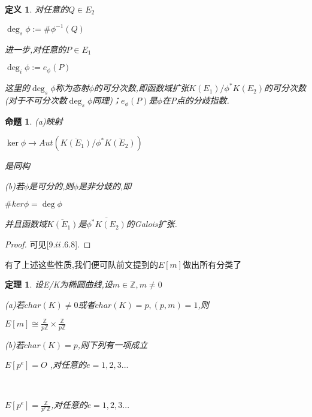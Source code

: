 \documentclass[11pt]{ctexart}
\DeclareMathOperator{\Deg}{deg}
\newtheorem{thm}{定理}[section]
\newtheorem{defi}{定义}[section]
\newtheorem{pro}{命题}[section]
\begin{document}
\begin{defi}
  对任意的$Q \in E_2$
    \begin{center}
        $\Deg_s\phi:= \#\phi^{-1}(Q)$
    \end{center}

    \noindent 进一步,对任意的$ P \in E_1$
    \begin{center}
        $\Deg_i\phi:=e_{\phi}(P)$
    \end{center}

    \noindent 这里的$\Deg_s\phi$称为态射$\phi$的可分次数,即函数域扩张$K(E_1)/\phi^{*}K(E_2)$的可分次数(对于不可分次数$\Deg_s\phi$同理)；$e_{\phi}(P)$是$\phi$在P点的分歧指数.
\end{defi}
\begin{pro}
    (a)映射
    \begin{center}
        $\ker\phi \longrightarrow Aut(\overline{K(E_1)}/\phi^{*}\overline{K(E_2)})$
    \end{center}
    \noindent 是同构

    (b)若$\phi$是可分的,则$\phi$是非分歧的,即
    \begin{center}
        $\#ker\phi=\Deg\phi$
    \end{center}
    \noindent 并且函数域$\overline{K(E_1)}$是$\overline{\phi^{*}K(E_2)}$的Galois扩张.
\end{pro}
    


\begin{proof}
    可见[9.$\uppercase\expandafter{\romannumeral2}$.6.8].
\end{proof}

有了上述这些性质,我们便可队前文提到的$E[m]$做出所有分类了

\begin{thm}设E/K为椭圆曲线,设$m\in \mathbb{Z}$$,m\neq 0$

    (a)若$char(K)\neq 0$或者$char(K)=p$$,(p,m)=1$,则
    \begin{center}
        
        $E[m]\cong \frac{\mathbb{Z}}{p\mathbb{Z}}\times \frac{\mathbb{Z}}{p\mathbb{Z}}$
    \end{center}

    (b)若$char(K)=p$,则下列有一项成立
    \begin{center}
        $E[p^e]={O}$ ,对任意的$e=1,2,3...$

        ~

        $E[p^e]= \frac{\mathbb{Z}}{p^e\mathbb{Z}}$,对任意的$e=1,2,3...$
    \end{center}


\end{thm}
\end{document}
